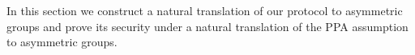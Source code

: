 In this section we construct a natural translation of our protocol to asymmetric groups and prove its security under a natural translation of the PPA assumption to asymmetric groups.
